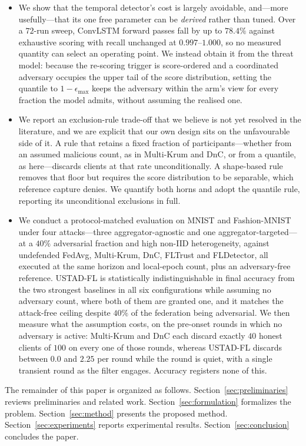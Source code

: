 \documentclass[journal]{IEEEtran}
\begin{document}
\begin{itemize}
    \item We show that the temporal detector's cost is largely avoidable, and---more usefully---that its one free parameter can be \emph{derived} rather than tuned. Over a $72$-run sweep, ConvLSTM forward passes fall by up to $78.4\%$ against exhaustive scoring with recall unchanged at $0.997$--$1.000$, so no measured quantity can select an operating point. We instead obtain it from the threat model: because the re-scoring trigger is score-ordered and a coordinated adversary occupies the upper tail of the score distribution, setting the quantile to $1-\epsilon_{\max}$ keeps the adversary within the arm's view for every fraction the model admits, without assuming the realised one.
    \item We report an exclusion-rule trade-off that we believe is not yet resolved in the literature, and we are explicit that our own design sits on the unfavourable side of it. A rule that retains a fixed fraction of participants---whether from an assumed malicious count, as in Multi-Krum and DnC, or from a quantile, as here---discards clients at that rate unconditionally. A shape-based rule removes that floor but requires the score distribution to be separable, which reference capture denies. We quantify both horns and adopt the quantile rule, reporting its unconditional exclusions in full.

    \item We conduct a protocol-matched evaluation on MNIST and Fashion-MNIST under four attacks---three aggregator-agnostic and one aggregator-targeted---at a $40\%$ adversarial fraction and high non-IID heterogeneity, against undefended FedAvg, Multi-Krum, DnC, FLTrust and FLDetector, all executed at the same horizon and local-epoch count, plus an adversary-free reference. USTAD-FL is statistically indistinguishable in final accuracy from the two strongest baselines in all six configurations while assuming no adversary count, where both of them are granted one, and it matches the attack-free ceiling despite $40\%$ of the federation being adversarial. We then measure what the assumption costs, on the pre-onset rounds in which no adversary is active: Multi-Krum and DnC each discard exactly $40$ honest clients of $100$ on every one of those rounds, whereas USTAD-FL discards between $0.0$ and $2.25$ per round while the round is quiet, with a single transient round as the filter engages. Accuracy registers none of this.
\end{itemize}

The remainder of this paper is organized as follows. Section~\ref{sec:preliminaries} reviews preliminaries and related work. Section~\ref{sec:formulation} formalizes the problem. Section~\ref{sec:method} presents the proposed method. Section~\ref{sec:experiments} reports experimental results. Section~\ref{sec:conclusion} concludes the paper.
\end{document}
